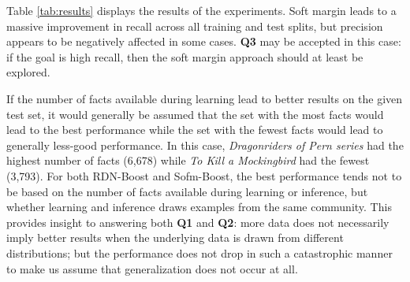 \documentclass[letterpaper]{article}
\begin{document}
Table \ref{tab:results} displays the results of the experiments. Soft margin leads to a massive improvement in recall across all training and test splits, but precision appears to be negatively affected in some cases. \textbf{Q3} may be accepted in this case: if the goal is high recall, then the soft margin approach should at least be explored.

If the number of facts available during learning lead to better results on the given test set, it would generally be assumed that the set with the most facts would lead to the best performance while the set with the fewest facts would lead to generally less-good performance. In this case, \textit{Dragonriders of Pern series} had the highest number of facts (6,678) while \textit{To Kill a Mockingbird} had the fewest (3,793). For both RDN-Boost and Sofm-Boost, the best performance tends not to be based on the number of facts available during learning or inference, but whether learning and inference draws examples from the same community. This provides insight to answering both \textbf{Q1} and \textbf{Q2}: more data does not necessarily imply better results when the underlying data is drawn from different distributions; but the performance does not drop in such a catastrophic manner to make us assume that generalization does not occur at all.
\end{document}
